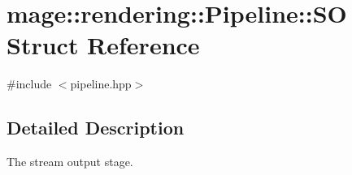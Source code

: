\hypertarget{structmage_1_1rendering_1_1_pipeline_1_1_s_o}{}\section{mage\+:\+:rendering\+:\+:Pipeline\+:\+:SO Struct Reference}
\label{structmage_1_1rendering_1_1_pipeline_1_1_s_o}


{\ttfamily \#include $<$pipeline.\+hpp$>$}



\subsection{Detailed Description}
The stream output stage. 